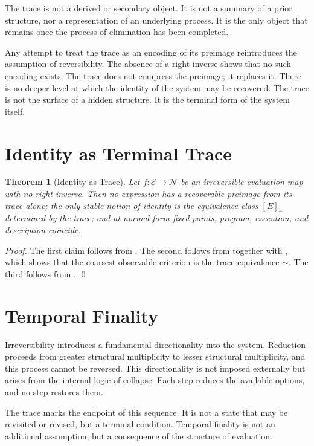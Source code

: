 \documentclass[12pt, oneside]{amsbook}
\theoremstyle{plain}
\newtheorem{theorem}{Theorem}[section]
\theoremstyle{definition}
\theoremstyle{remark}
\newcommand{\Expr}{\mathcal{E}}
\newcommand{\NF}{\mathcal{N}}
\newcommand{\evalf}{f}
\newcommand{\tequiv}{\sim}
\begin{document}
The trace is not a derived or secondary object. It is not a summary of a prior
structure, nor a representation of an underlying process. It is the only object
that remains once the process of elimination has been completed.

Any attempt to treat the trace as an encoding of its preimage reintroduces the
assumption of reversibility. The absence of a right inverse shows that no such
encoding exists. The trace does not compress the preimage; it replaces it. There
is no deeper level at which the identity of the system may be recovered. The
trace is not the surface of a hidden structure. It is the terminal form of the
system itself.

\section{Identity as Terminal Trace}
\label{sec:concl:theorem}

\begin{theorem}[Identity as Trace]
\label{thm:identity-trace}
  Let $\evalf : \Expr \to \NF$ be an irreversible evaluation map with no right
  inverse. Then no expression has a recoverable preimage from its trace alone;
  the only stable notion of identity is the equivalence class $[E]_{\tequiv}$
  determined by the trace; and at normal-form fixed points, program, execution,
  and description coincide.
\end{theorem}

\begin{proof}
The first claim follows from . The second follows
from  together with , which shows
that the coarsest observable criterion is the trace equivalence $\tequiv$.
The third follows from . \qed
\end{proof}

\section{Temporal Finality}
\label{sec:concl:time}

Irreversibility introduces a fundamental directionality into the system.
Reduction proceeds from greater structural multiplicity to lesser structural
multiplicity, and this process cannot be reversed. This directionality is not
imposed externally but arises from the internal logic of collapse. Each step
reduces the available options, and no step restores them.

The trace marks the endpoint of this sequence. It is not a state that may be
revisited or revised, but a terminal condition. Temporal finality is not an
additional assumption, but a consequence of the structure of evaluation.
\end{document}
